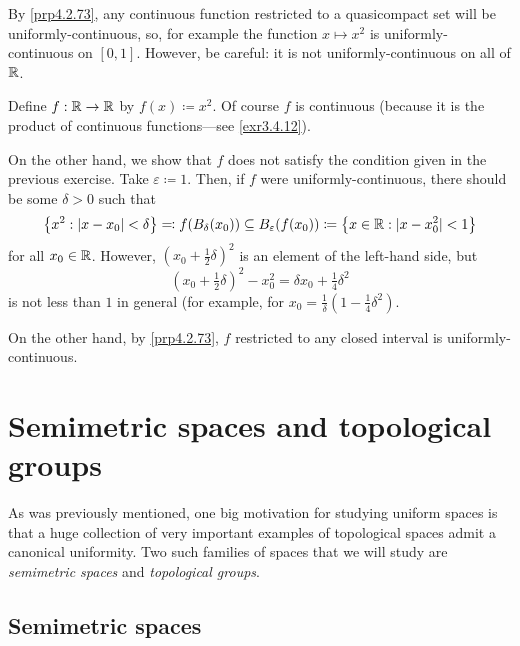 \begin{exm}
By \cref{prp4.2.73}, any continuous function restricted to a quasicompact set will be uniformly-continuous, so, for example the function $x\mapsto x^2$ is uniformly-continuous on $[0,1]$.  However, be careful:  it is not uniformly-continuous on all of $\mathbb{R}$.
\end{exm}
\begin{exm}\label{exm4.2.85}
Define $f:\mathbb{R} \rightarrow \mathbb{R}$ by $f(x)\coloneqq x^2$.  Of course $f$ is continuous (because it is the product of continuous functions---see \cref{exr3.4.12}).

On the other hand, we show that $f$ does not satisfy the condition given in the previous exercise.  Take $\varepsilon \coloneqq 1$.  Then, if $f$ were uniformly-continuous, there should be some $\delta >0$ such that
\begin{equation}
\left\{ x^2:\lvert x-x_0\rvert<\delta \right\} \eqqcolon f(B_\delta (x_0))\subseteq B_{\varepsilon}(f(x_0))\coloneqq\left\{ x\in \mathbb{R} :\lvert x-x_0^2\rvert<1\right\} 
\end{equation}
for all $x_0\in \mathbb{R}$.  However, $(x_0+\frac{1}{2}\delta )^2$ is an element of the left-hand side, but
\begin{equation}
\left( x_0+\tfrac{1}{2}\delta \right) ^2-x_0^2=\delta x_0+\tfrac{1}{4}\delta ^2
\end{equation}
is not less than $1$ in general (for example, for $x_0=\frac{1}{\delta}(1-\tfrac{1}{4}\delta ^2)$.

On the other hand, by \cref{prp4.2.73}, $f$ restricted to any closed interval is uniformly-continuous.
\end{exm}

\section{Semimetric spaces and topological groups}

As was previously mentioned, one big motivation for studying uniform spaces is that a huge collection of very important examples of topological spaces admit a canonical uniformity.  Two such families of spaces that we will study are \emph{semimetric spaces} and \emph{topological groups}.

\subsection{Semimetric spaces}

